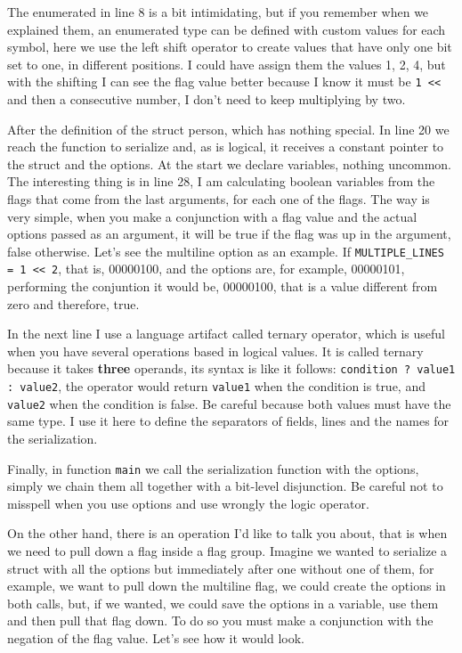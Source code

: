 \documentclass[a4paper]{article}
\begin{document}
The enumerated in line 8 is a bit intimidating, but if you remember when
we explained them, an enumerated type can be defined with custom values for
each symbol, here we use the left shift operator to create values that have only
one bit set to one, in different positions. I could have assign them the values
1, 2, 4, but with the shifting I can see the flag value better because I know
it must be \verb!1 <<! and then a consecutive number, I don't need to keep
multiplying by two.

After the definition of the struct person, which has nothing special. In line 20
we reach the function to serialize and, as is logical, it receives a constant
pointer to the struct and the options. At the start we declare variables,
nothing uncommon. The interesting thing is in line 28, I am calculating boolean
variables from the flags that come from the last arguments, for each one of the
flags. The way is very simple, when you make a conjunction with a flag value
and the actual options passed as an argument, it will be true if the flag was up
in the argument, false otherwise. Let's see the multiline option as an example.
If \verb!MULTIPLE_LINES = 1 << 2!, that is, 00000100, and the options are, for
example, 00000101, performing the conjuntion it would be, 00000100, that is
a value different from zero and therefore, true.

In the next line I use a language artifact called ternary operator, which is
useful when you have several operations based in logical values. It is called
ternary because it takes \textbf{three} operands, its syntax is like it follows:
\verb!condition ? value1 : value2!, the operator would return \verb!value1! when
the condition is true, and \verb!value2! when the condition is false. Be
careful because both values must have the same type. I use it here to define
the separators of fields, lines and the names for the serialization.

Finally, in function \verb!main! we call the serialization function with the
options, simply we chain them all together with a bit-level disjunction. Be
careful not to misspell when you use options and use wrongly the logic operator.

On the other hand, there is an operation I'd like to talk you about, that is
when we need to pull down a flag inside a flag group. Imagine we wanted to
serialize a struct with all the options but immediately after one without one of
them, for example, we want to pull down the multiline flag, we could create the
options in both calls, but, if we wanted, we could save the options in a
variable, use them and then pull that flag down. To do so you must make a
conjunction with the negation of the flag value. Let's see how it would look.
\end{document}
